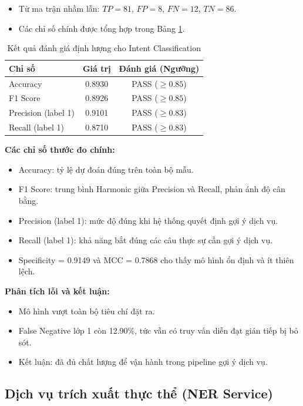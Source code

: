 \begin{itemize}
    \item Từ ma trận nhầm lẫn: $TP=81$, $FP=8$, $FN=12$, $TN=86$.
    \item Các chỉ số chính được tổng hợp trong Bảng \ref{tab:intent_results}.
\end{itemize}

\begin{table}[H]
\centering
\begin{tabular}{|l|c|c|}
\hline
\textbf{Chỉ số} & \textbf{Giá trị} & \textbf{Đánh giá (Ngưỡng)} \\
\hline
Accuracy & 0.8930 & PASS ($\geq 0.85$) \\
\hline
F1 Score & 0.8926 & PASS ($\geq 0.85$) \\
\hline
Precision (label 1) & 0.9101 & PASS ($\geq 0.83$) \\
\hline
Recall (label 1) & 0.8710 & PASS ($\geq 0.83$) \\
\hline
\end{tabular}
\caption{Kết quả đánh giá định lượng cho Intent Classification}
\label{tab:intent_results}
\end{table}

\textbf{Các chỉ số thước đo chính:}
\begin{itemize}
    \item Accuracy: tỷ lệ dự đoán đúng trên toàn bộ mẫu.
    \item F1 Score: trung bình Harmonic giữa Precision và Recall, phản ánh độ cân bằng.
    \item Precision (label 1): mức độ đúng khi hệ thống quyết định gợi ý dịch vụ.
    \item Recall (label 1): khả năng bắt đúng các câu thực sự cần gợi ý dịch vụ.
    \item Specificity = 0.9149 và MCC = 0.7868 cho thấy mô hình ổn định và ít thiên lệch.
\end{itemize}

\textbf{Phân tích lỗi và kết luận:}

\begin{itemize}
    \item Mô hình vượt toàn bộ tiêu chí đặt ra.
    \item False Negative lớp 1 còn 12.90\%, tức vẫn có truy vấn diễn đạt gián tiếp bị bỏ sót.
    \item Kết luận: đã đủ chất lượng để vận hành trong pipeline gợi ý dịch vụ.
\end{itemize}

\subsection{Dịch vụ trích xuất thực thể (NER Service)}

